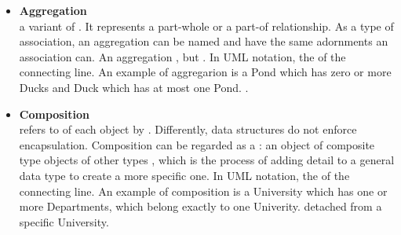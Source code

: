 \begin{itemize}
        \item \textbf{Aggregation}\\
              a variant of . 
              It represents a part-whole or a part-of relationship. 
              As a type of association, an aggregation can be named and 
              have the same adornments an association can.
              \newline
              An aggregation , but 
              .
              \newline
              In UML notation, the  of the connecting line. 
              \newline
              An example of aggregarion is a Pond which has zero or more 
              Ducks and Duck which has at most one Pond.
              \newline
              .
              
        \item \textbf{Composition}\\ 
              refers to  of each 
              object by . Differently, data structures do 
              not enforce encapsulation.
              \newline
              Composition can be regarded as a : an object of composite type  objects 
              of other types
              \newline
              , 
              which is the process of adding detail to a general data type 
              to create a more specific one.
              \newline
              In UML notation, the  of the connecting line. An example of 
              composition is a University which has one or more 
              Departments, which belong exactly to one Univerity.
              \newline
              detached from a specific University.
    \end{itemize}
